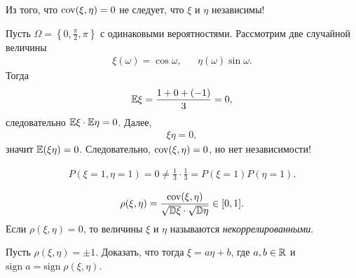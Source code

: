 \begin{remrk}
 Из того, что $ \mathrm{cov}(\xi,\eta) = 0 $ не следует, что $ \xi $ и $ \eta $ независимы!
\end{remrk}
\begin{exmpl}
 Пусть $ \Omega = \left\{ 0,\frac{\pi}{2},\pi \right\} $ с одинаковыми вероятностями. Рассмотрим две случайной величины
 \begin{align*}
  \xi(\omega) = \cos \omega, & &\eta(\omega) \sin \omega.
 \end{align*} Тогда
 \begin{align*}
  \mathbb E\xi = \frac{1 + 0 + (-1)}{3} = 0,
 \end{align*} следовательно $ \mathbb E\xi \cdot \mathbb E\eta = 0 $. Далее,
 \begin{align*}
  \xi\eta = 0, 
 \end{align*} значит $ \mathbb E(\xi\eta) = 0 $. Следовательно, $ \mathrm{cov}(\xi,\eta) = 0 $, но нет независимости!
 
\begin{align*}
 P(\xi = 1,\eta =1) = 0 \neq \frac{1}{3} \cdot \frac{1}{3} = P(\xi = 1) P(\eta = 1).
\end{align*}
\end{exmpl}

\begin{df}
 
\begin{align*}
 \rho(\xi,\eta) = \frac{\mathrm{cov}(\xi,\eta)}{\sqrt{\mathbb D\xi} \cdot \sqrt{\mathbb D\eta}} \in [0,1].
\end{align*} Если $ \rho(\xi,\eta) = 0 $, то величины $ \xi $ и $ \eta $ называются \textit{некоррелированными}.

\end{df}

\begin{exercs*}
 Пусть $ \rho(\xi,\eta) = \pm 1 $. Доказать, что тогда $ \xi = a\eta + b $, где $ a, b \in \mathbb{R} $ и $ \mathrm{sign}\;a = \mathrm{sign}\;\rho(\xi,\eta) $.
\end{exercs*}
